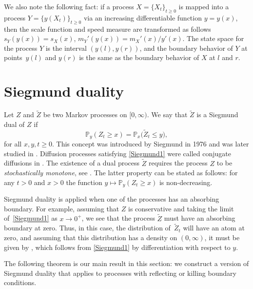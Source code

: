 \documentclass[10pt,a4paper]{amsart}
\numberwithin{equation}{section}
\theoremstyle{definition}
\def\p{{\mathbb P}}
\begin{document}
We also note the following fact: if a process $X=\{X_t\}_{t\ge 0}$ is mapped into a process $Y=\{y(X_t)\}_{t\ge 0}$ via an increasing differentiable function $y=y(x)$, then the scale function and speed measure are transformed as follows
$
s_Y(y(x))=s_X(x)$, $ m_Y'(y(x))=m_X'(x)/y'(x)$.
The state space for the process $Y$ is the interval $(y(l), y(r))$, and the boundary behavior of $Y$ at points~$y(l)$ and $y(r)$ is the same as the boundary behavior of $X$ at $l$ and $r$.


 \section{Siegmund duality}\label{section_Siegmund}

Let $Z$ and $\widetilde Z$ be two Markov processes on $[0,\infty)$. We say that $\widetilde Z$ is a Siegmund dual of $Z$ if
\begin{equation}\label{Siegmund1}
\p_y(Z_t \ge x)=\p_x\bigl(\widetilde Z_t\le y\bigr),
\end{equation}
for all $x,y,t \ge 0$. This concept was introduced by Siegmund \cite{Siegmund_1976} in 1976 and was later studied in \cite{Clifford_1985,Cox_1984,Kolokoltsov_2011}. Diffusion processes satisfying \eqref{Siegmund1} were called conjugate diffusions in \cite{Toth_1996}. The existence of a dual process $\widetilde Z$ requires the process $Z$ to be {\it stochastically monotone}, see \cite{Clifford_1985,Siegmund_1976}. The latter property can be stated as follows: for any $t> 0$ and $x>0$ the function $y\mapsto \p_y(Z_t \ge x)$ is non-decreasing.

Siegmund duality is applied when one of the processes has an absorbing boundary. For example, assuming that $Z$ is conservative and taking the limit of~\eqref{Siegmund1} as $x \to 0^+$, we see that the process $\widetilde Z$ must have an absorbing boundary at zero. Thus, in this case, the distribution of~$\widetilde Z_t$ will have an atom at zero, and assuming that this distribution has a density on $(0,\infty)$, it must be given by
\smash{$p_t^{\widetilde Z}(x,y)=\partial_y \p_y(Z_t \ge x)$},
which follows from \eqref{Siegmund1} by differentiation with respect to $y$.

 The following theorem is our main result in this section: we construct a version of Siegmund duality that applies to processes with reflecting or killing boundary conditions.
\end{document}
